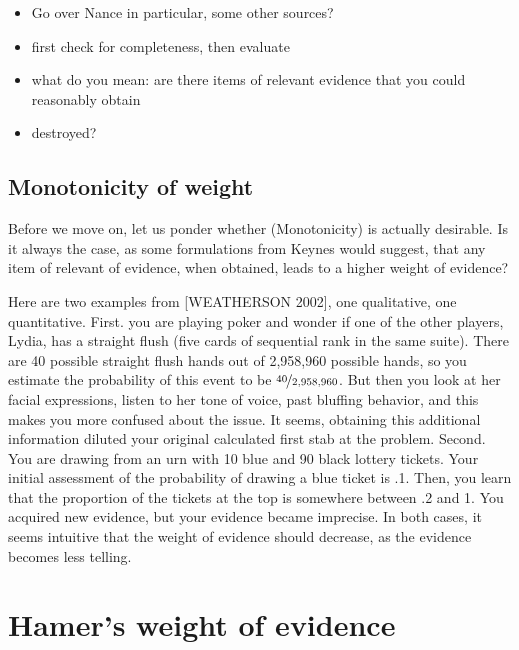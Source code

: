 \documentclass[
  10pt,
  dvipsnames,enabledeprecatedfontcommands]{scrartcl}
\begin{document}
\begin{itemize}
\item
  Go over Nance in particular, some other sources?
\item
  first check for completeness, then evaluate
\item
  what do you mean: are there items of relevant evidence that you could
  reasonably obtain
\item
  destroyed?
\end{itemize}

\hypertarget{monotonicity-of-weight}{%
\subsection{Monotonicity of weight}\label{monotonicity-of-weight}}

Before we move on, let us ponder whether (Monotonicity) is actually
desirable. Is it always the case, as some formulations from Keynes would
suggest, that any item of relevant of evidence, when obtained, leads to
a higher weight of evidence?

Here are two examples from {[}WEATHERSON 2002{]}, one qualitative, one
quantitative.\todo{CITE B. Weatherson. Keynes, uncertainty and interest rates. Cambridge Journal of Eco-
nomics, 26 (1): 47-62, 2002.]} First. you are playing poker and wonder
if one of the other players, Lydia, has a straight flush (five cards of
sequential rank in the same suite). There are 40 possible straight flush
hands out of 2,958,960 possible hands, so you estimate the probability
of this event to be \(\nicefrac{40}{2,958,960}\). But then you look at
her facial expressions, listen to her tone of voice, past bluffing
behavior, and this makes you more confused about the issue. It seems,
obtaining this additional information diluted your original calculated
first stab at the problem. Second. You are drawing from an urn with 10
blue and 90 black lottery tickets. Your initial assessment of the
probability of drawing a blue ticket is .1. Then, you learn that the
proportion of the tickets at the top is somewhere between .2 and 1. You
acquired new evidence, but your evidence became imprecise. In both
cases, it seems intuitive that the weight of evidence should decrease,
as the evidence becomes less telling.

\hypertarget{hamers-weight-of-evidence}{%
\section{Hamer's weight of evidence}\label{hamers-weight-of-evidence}}
\end{document}
